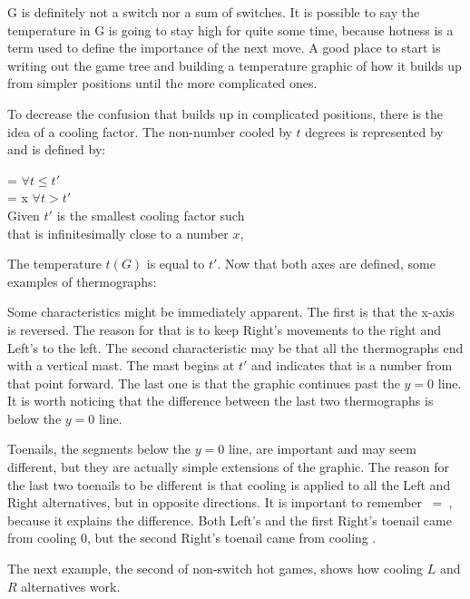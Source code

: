 G is definitely not a switch nor a sum of switches. It is possible to say the temperature in G is going to stay high for quite some time, because hotness is a term used to define the importance of the next move. A good place to start is writing out the game tree and building a temperature graphic of how it builds up from simpler positions until the more complicated ones.

To decrease the confusion that builds up in complicated positions, there is the idea of a cooling factor. The non-number \Gm{} cooled by $t$ degrees is represented by  and is defined by:
\begin{center}
	 =  $\forall t \leq t'$\\
	 = x $\forall t > t'$\\
	Given $t'$ is the smallest cooling factor such\\
	that  is infinitesimally close to a number $x$,
\end{center}

The temperature $t(G)$ is equal to $t'$. Now that both axes are defined, some examples of thermographs:



Some characteristics might be immediately apparent. The first is that the x-axis is reversed. The reason for that is to keep Right's movements to the right and Left's to the left. The second characteristic may be that all the thermographs end with a vertical mast. The mast begins at $t'$ and indicates that \Gm{} is a number from that point forward. The last one is that the graphic continues past the $y=0$ line. It is worth noticing that the difference between the last two thermographs is below the $y=0$ line.

Toenails, the segments below the $y=0$ line, are important and may seem different, but they are actually simple extensions of the graphic. The reason for the last two toenails to be different is that cooling is applied to all the Left and Right alternatives, but in opposite directions. It is important to remember \hbox{ = }, because it explains the difference. Both Left's and the first Right's toenail came from cooling 0, but the second Right's toenail came from cooling .

The next example, the second of non-switch hot games, shows how cooling $L$ and $R$ alternatives work.\\

